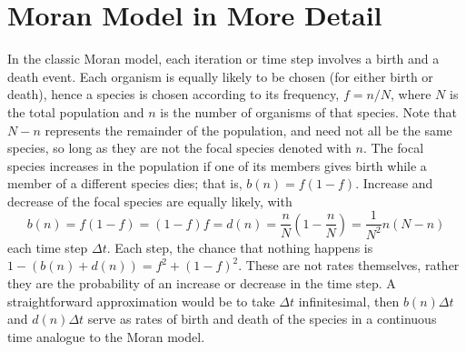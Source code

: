 \section{Moran Model in More Detail}
In the classic Moran model, each iteration or time step involves a birth and a death event.
Each organism is equally likely to be chosen (for either birth or death), hence a species is chosen according to its frequency, $f=n/N$, where $N$ is the total population and $n$ is the number of organisms of that species.
Note that $N-n$ represents the remainder of the population, and need not all be the same species, so long as they are not the focal species denoted with $n$. %
The focal species increases in the population if one of its members gives birth while a member of a different species dies; that is, $b(n) = f(1-f)$.
Increase and decrease of the focal species are equally likely, with
\begin{equation}
b(n) = f(1-f) = (1-f)f = d(n) = \frac{n}{N}\left(1-\frac{n}{N}\right) = \frac{1}{N^2}n(N-n)
\end{equation}
each time step $\Delta t$.
Each step, the chance that nothing happens is $1-\left(b(n)+d(n)\right) = f^2 + (1-f)^2$.
These are not rates themselves, rather they are the probability of an increase or decrease in the time step.
A straightforward approximation would be to take $\Delta t$ infinitesimal, then $b(n)\Delta t$ and $d(n)\Delta t$ serve as rates of birth and death of the species in a continuous time analogue to the Moran model.

